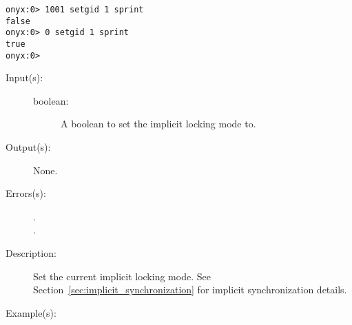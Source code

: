 \begin{description}
\begin{description}
\begin{verbatim}
onyx:0> 1001 setgid 1 sprint
false
onyx:0> 0 setgid 1 sprint
true
onyx:0>
		\end{verbatim}
	\end{description}
\label{systemdict:setlocking}
\item[{\onyxop{boolean}{setlocking}{--}}: ]
	\begin{description}\item[]
	\item[Input(s): ]
		\begin{description}\item[]
		\item[boolean: ]
			A boolean to set the implicit locking mode to.
		\end{description}
	\item[Output(s): ] None.
	\item[Errors(s): ]
		\begin{description}\item[]
		\item[.]
		\item[.]
		\end{description}
	\item[Description: ]
		Set the current implicit locking mode.  See
		Section~\ref{sec:implicit_synchronization} for implicit
		synchronization details.
	\item[Example(s): ]\begin{verbatim}


\end{verbatim}
\end{description}
\end{description}
